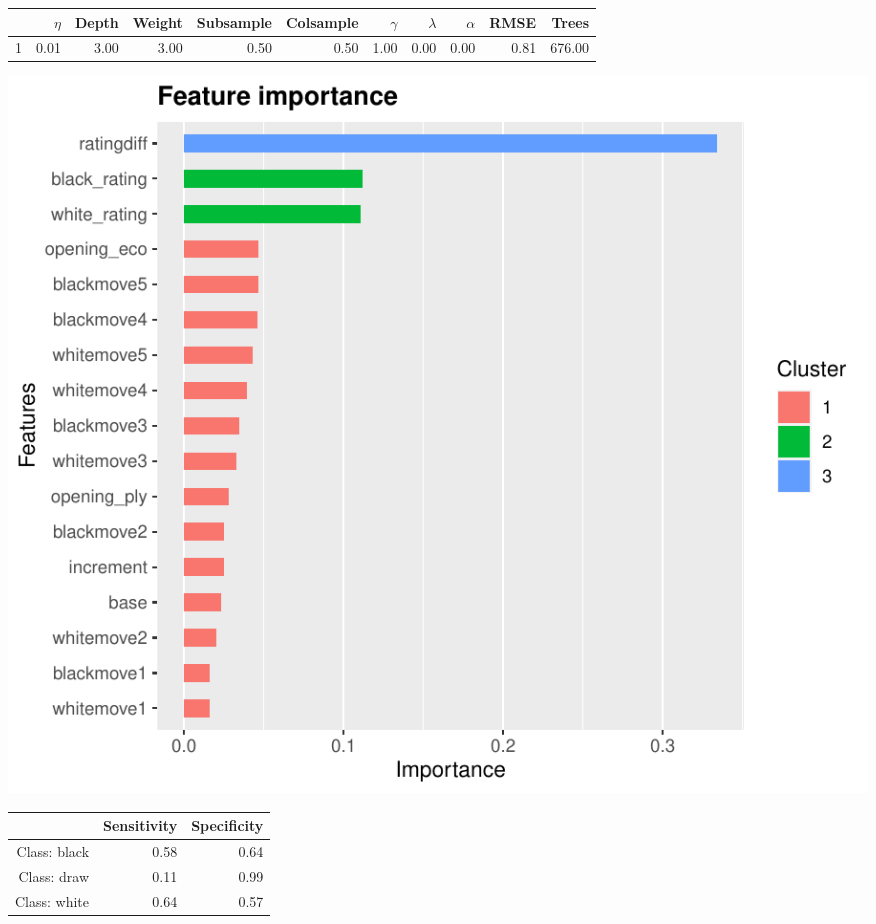 \documentclass[12pt,preprint, authoryear]{elsarticle}
\let\origfigure\figure
\let\endorigfigure\endfigure
\renewenvironment{figure}[1][2] {
    \expandafter\origfigure\expandafter[H]
} {
    \endorigfigure
}
\let\origtable\table
\let\endorigtable\endtable
\renewenvironment{table}[1][2] {
    \expandafter\origtable\expandafter[H]
} {
    \endorigtable
}
\numberwithin{equation}{section}
\numberwithin{figure}{section}
\numberwithin{table}{section}
\begin{document}
\begin{table}[H]
\centering
\begin{tabular}{rrrrrrrrrrr}
  \hline
 & $\eta$ & Depth & Weight & Subsample & Colsample& $\gamma$ & $\lambda$ & $\alpha$ & RMSE & Trees \\ 
  \hline
1 & 0.01 & 3.00 & 3.00 & 0.50 & 0.50 & 1.00 & 0.00 & 0.00 & 0.81 & 676.00 \\ 

   \hline
\end{tabular}
\caption{Hypergrid Top Half} 
\end{table}

\begin{figure}[H]

{\centering \includegraphics{WriteUp_files/figure-latex/importancehigh2-1} 

}

\caption{Feature Importance Tuned Model: Top Half\label{Figure14}}\label{fig:importancehigh2}
\end{figure}

\begin{table}[ht]
\centering
\begin{tabular}{rrr}
  \hline
 & Sensitivity & Specificity \\ 
  \hline
Class: black & 0.58 & 0.64 \\ 
  Class: draw & 0.11 & 0.99 \\ 
  Class: white & 0.64 & 0.57 \\ 
   \hline
\end{tabular}
\caption{Accuracy Top Sample: Tuned Model} 
\end{table}
\end{document}
